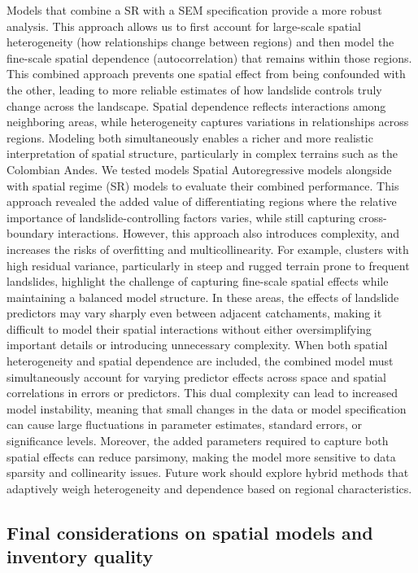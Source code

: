 \documentclass[lineno,pdflatex,sn-basic]{sn-jnl}%
\theoremstyle{thmstyleone}%
\theoremstyle{thmstyletwo}%
\theoremstyle{thmstylethree}%
\begin{document}
Models that combine a SR with a SEM specification provide a more robust analysis. This approach allows us to first account for large-scale spatial heterogeneity (how relationships change between regions) and then model the fine-scale spatial dependence (autocorrelation) that remains within those regions.
This combined approach prevents one spatial effect from being confounded with the other, leading to more reliable estimates of how landslide controls truly change across the landscape.
Spatial dependence reflects interactions among neighboring areas, while heterogeneity captures variations in relationships across regions. 
Modeling both simultaneously enables a richer and more realistic interpretation of spatial structure, particularly in complex terrains such as the Colombian Andes.
We tested models Spatial Autoregressive models alongside with spatial regime (SR) models to evaluate their combined performance.  
This approach revealed the added value of differentiating regions where the relative importance of landslide-controlling factors varies, while still capturing cross-boundary interactions.
However, this approach also introduces complexity, and increases the risks of overfitting and multicollinearity. 
For example, clusters with high residual variance, particularly in steep and rugged terrain prone to frequent landslides, highlight the challenge of capturing fine-scale spatial effects while maintaining a balanced model structure. 
In these areas, the effects of landslide predictors may vary sharply even between adjacent catchaments, making it difficult to model their spatial interactions without either oversimplifying important details or introducing unnecessary complexity. 
When both spatial heterogeneity and spatial dependence are included, the combined model must simultaneously account for varying predictor effects across space and spatial correlations in errors or predictors. 
This dual complexity can lead to increased model instability, meaning that small changes in the data or model specification can cause large fluctuations in parameter estimates, standard errors, or significance levels. 
Moreover, the added parameters required to capture both spatial effects can reduce parsimony, making the model more sensitive to data sparsity and collinearity issues.
Future work should explore hybrid methods that adaptively weigh heterogeneity and dependence based on regional characteristics.

\subsection{Final considerations on spatial models and inventory quality}
\end{document}
